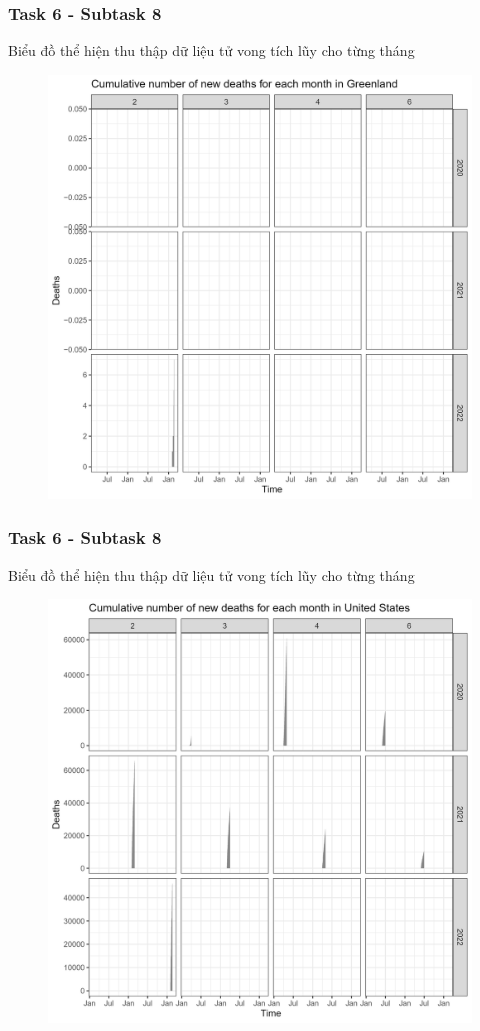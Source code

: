 \documentclass[english,10pt,table]{beamer}
\begin{document}
\frame
{
    \frametitle{Task 6 - Subtask 8}
    \begin{block}{Biểu đồ thể hiện thu thập dữ liệu tử vong tích lũy cho từng tháng}
    \begin{figure}[H]
		\centering
		\includegraphics[scale=0.11]{images/6.8.2.png}
	\end{figure}
    \end{block}
}
\frame
{
    \frametitle{Task 6 - Subtask 8}
    \begin{block}{Biểu đồ thể hiện thu thập dữ liệu tử vong tích lũy cho từng tháng}
    \begin{figure}[H]
		\centering
		\includegraphics[scale=0.11]{images/6.8.3.png}
	\end{figure}
    \end{block}
}
\end{document}
